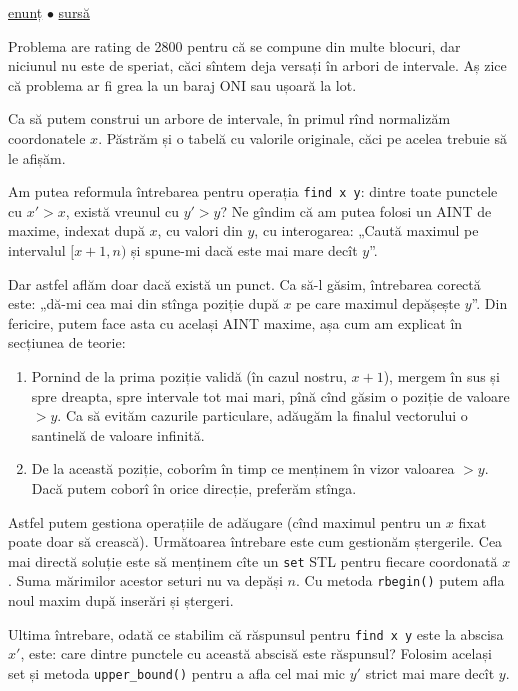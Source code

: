 \href{https://codeforces.com/contest/19/problem/D}{enunț}
$\bullet$
\href{https://codeforces.com/contest/19/submission/281139891}{sursă}

Problema are rating de 2800 pentru că se compune din multe blocuri, dar niciunul nu este de speriat, căci sîntem deja versați în arbori de intervale.  Aș zice că problema ar fi grea la un baraj ONI sau ușoară la lot.

Ca să putem construi un arbore de intervale, în primul rînd normalizăm coordonatele $x$. Păstrăm și o tabelă cu valorile originale, căci pe acelea trebuie să le afișăm.

Am putea reformula întrebarea pentru operația \texttt{find x y}: dintre toate punctele cu $x'>x$, există vreunul cu $y' > y$? Ne gîndim că am putea folosi un AINT de maxime, indexat după $x$, cu valori din $y$, cu interogarea: „Caută maximul pe intervalul $[x + 1, n)$ și spune-mi dacă este mai mare decît $y$”.

Dar astfel aflăm doar dacă există un punct. Ca să-l găsim, întrebarea corectă este: „dă-mi cea mai din stînga poziție după $x$ pe care maximul depășește $y$”. Din fericire, putem face asta cu același AINT maxime, așa cum am explicat în secțiunea de teorie:

\begin{enumerate}
  \item Pornind de la prima poziție validă (în cazul nostru, $x+1$), mergem în sus și spre dreapta, spre intervale tot mai mari, pînă cînd găsim o poziție de valoare $> y$. Ca să evităm cazurile particulare, adăugăm la finalul vectorului o santinelă de valoare infinită.

  \item De la această poziție, coborîm în timp ce menținem în vizor valoarea $> y$. Dacă putem coborî în orice direcție, preferăm stînga.
\end{enumerate}

Astfel putem gestiona operațiile de adăugare (cînd maximul pentru un $x$ fixat poate doar să crească). Următoarea întrebare este cum gestionăm ștergerile. Cea mai directă soluție este să menținem cîte un \texttt{set} STL pentru fiecare coordonată $x$. Suma mărimilor acestor seturi nu va depăși $n$. Cu metoda \texttt{rbegin()} putem afla noul maxim după inserări și ștergeri.

Ultima întrebare, odată ce stabilim că răspunsul pentru \texttt{find x y} este la abscisa $x'$, este: care dintre punctele cu această abscisă este răspunsul? Folosim același set și metoda \texttt{upper_bound()} pentru a afla cel mai mic $y'$ strict mai mare decît $y$.

